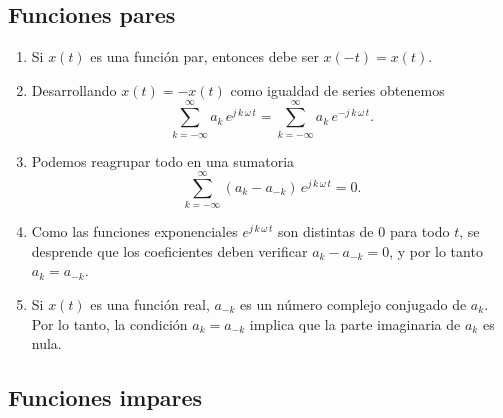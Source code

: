 \subsection{Funciones pares}

\begin{enumerate}

\item Si $x(t)$ es una funci\'{o}n par, entonces debe ser $x(-t) = x(t)$.

\item Desarrollando $x(t) = -x(t)$ como igualdad de series obtenemos 
\begin{equation}\sum_{k=-\infty}^{\infty} a_{k} \, e^{j \, k \,
    \omega \, t} = \sum_{k=-\infty}^{\infty} a_{k} \, e^{-j \, k \,
    \omega \, t}.
\end{equation}

\item Podemos reagrupar todo en una sumatoria
\begin{equation}
  \sum_{k=-\infty}^{\infty} \left(a_{k} - a_{-k}\right)\, 
e^{j \, k \, \omega \, t} = 0.
\end{equation}

\item Como las funciones exponenciales $e^{j \, k \, \omega \, t}$
  son distintas de $0$ para todo $t$, se desprende que 
  los coeficientes deben verificar $a_{k} - a_{-k} = 0$, 
  y por lo tanto $a_{k} = a_{-k}$.

\item Si $x(t)$ es una funci\'{o}n real, $a_{-k}$ es un n\'{u}mero complejo conjugado de $a_{k}$.
Por lo tanto, la condici\'{o}n $a_{k} = a_{-k}$ implica que la parte imaginaria de $a_{k}$ es nula.
\end{enumerate}

\subsection{Funciones impares}

